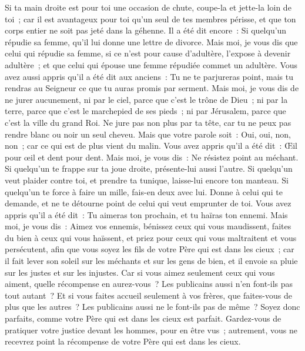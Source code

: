 \begin{multicols}{2}
Si ta main droite est pour toi une occasion de chute, coupe-la et jette-la loin de toi~; car il est avantageux pour toi qu'un seul de tes membres périsse, et que ton corps entier ne soit pas jeté dans la géhenne.
Il a été dit encore~: Si quelqu'un répudie sa femme, qu'il lui donne une lettre de divorce.
Mais moi, je vous dis que celui qui répudie sa femme, si ce n'est pour cause d'adultère, l'expose à devenir adultère~; et que celui qui épouse une femme répudiée commet un adultère.
Vous avez aussi appris qu'il a été dit aux anciens~: Tu ne te parjureras point, mais tu rendras au Seigneur ce que tu auras promis par serment.
Mais moi, je vous dis de ne jurer aucunement, ni par le ciel, parce que c'est le trône de Dieu~;
ni par la terre, parce que c'est le marchepied de ses pieds~; ni par Jérusalem, parce que c'est la ville du grand Roi.
Ne jure pas non plus par ta tête, car tu ne peux pas rendre blanc ou noir un seul cheveu.
Mais que votre parole soit~: Oui, oui, non, non~; car ce qui est de plus vient du malin.
Vous avez appris qu'il a été dit~: Œil pour œil et dent pour dent.
Mais moi, je vous dis~: Ne résistez point au méchant. Si quelqu'un te frappe sur ta joue droite, présente-lui aussi l'autre.
Si quelqu'un veut plaider contre toi, et prendre ta tunique, laisse-lui encore ton manteau.
Si quelqu'un te force à faire un mille, fais-en deux avec lui.
Donne à celui qui te demande, et ne te détourne point de celui qui veut emprunter de toi.
Vous avez appris qu'il a été dit~: Tu aimeras ton prochain, et tu haïras ton ennemi.
Mais moi, je vous dis~: Aimez vos ennemis, bénissez ceux qui vous maudissent, faites du bien à ceux qui vous haïssent, et priez pour ceux qui vous maltraitent et vous persécutent,
afin que vous soyez les fils de votre Père qui est dans les cieux~; car il fait lever son soleil sur les méchants et sur les gens de bien, et il envoie sa pluie sur les justes et sur les injustes.
Car si vous aimez seulement ceux qui vous aiment, quelle récompense en aurez-vous~? Les publicains aussi n'en font-ils pas tout autant~?
Et si vous faites accueil seulement à vos frères, que faites-vous de plus que les autres~? Les publicains aussi ne le font-ils pas de même~?
Soyez donc parfaits, comme votre Père qui est dans les cieux est parfait.
\VerseOne{}Gardez-vous de pratiquer votre justice devant les hommes, pour en être vus~; autrement, vous ne recevrez point la récompense de votre Père qui est dans les cieux.

\end{multicols}

